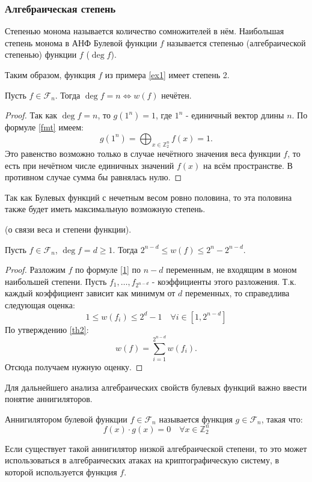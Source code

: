 \subsubsection{Алгебраическая степень}
\begin{definition}
Степенью монома называется количество сомножителей в нём. Наибольшая степень монома в АНФ Булевой функции $f$ называется степенью (алгебраической степенью) функции $f$ ($\deg f$).
\end{definition}
Таким образом, функция $f$ из примера \ref{ex1} имеет степень 2.
\begin{corollary}
    Пусть $f \in \mathcal{F}_n$. Тогда $\deg f = n \Leftrightarrow w(f)$ нечётен.
    \label{Нечетный вес}
\end{corollary}
\begin{proof}
    Так как $\deg f = n$, то $g(1^n) = 1$, где $1^n$ - единичный вектор длины $n$. По формуле \eqref{fmt} имеем:
    \[g(1^n) = \bigoplus_{x \in \mathbb{Z}_2^n}f(x) = 1.\]
    Это равенство возможно только в случае нечётного значения веса функции $f$, то есть при нечётном числе единичных значений $f(x)$ на всём пространстве. В противном случае сумма бы равнялась нулю.
\end{proof}
Так как Булевых функций с нечетным весом ровно половина, то эта половина также будет иметь максимальную возможную степень.
\begin{theorem}(о связи веса и степени функции). 
    
    Пусть $f \in \mathcal{F}_n$, $\deg f = d \geq 1$. Тогда $2^{n-d}\leq w(f) \leq 2^n - 2^{n-d}$.
    \label{w_and_deg}
\end{theorem}
\begin{proof}
    Разложим $f$ по формуле \eqref{1} по $n-d$ переменным, не входящим в моном наибольшей степени. Пусть $f_1, \dots, f_{2^{n-d}}$ - коэффициенты этого разложения. Т.к. каждый коэффициент зависит как минимум от $d$ переменных, то справедлива следующая оценка:
    \[1 \leq w(f_i)\leq 2^d-1 \quad \forall i \in [1,2^{n-d}]\]
    По утверждению \eqref{th2}:
    \[
    w(f) = \sum_{i=1}^{2^{n-d}}w(f_i).
    \]
    Отсюда получаем нужную оценку.
\end{proof}
Для дальнейшего анализа алгебраических свойств булевых функций важно ввести понятие аннигиляторов.
\begin{definition}
    Аннигилятором булевой функции $f \in \mathcal{F}_n$ называется функция $g \in \mathcal{F}_n$, такая что:
\[
    f(x)\cdot g(x) = 0 \quad \forall x \in \mathbb{Z}_2^n
\]
\end{definition}
Если существует такой аннигилятор низкой алгебраической степени, то это может использоваться в алгебраических атаках на криптографическую систему, в которой используется функция $f$.

